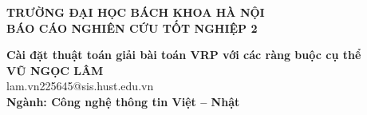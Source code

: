 \documentclass[main.tex]{subfiles}
\begin{document}
  \begin{titlepage}
    \thispagestyle{empty}
    \begin{center}
      {\textbf{\large{TRƯỜNG ĐẠI HỌC BÁCH KHOA HÀ NỘI}}}\\[4cm]

      {\textbf{\huge{BÁO CÁO NGHIÊN CỨU TỐT NGHIỆP 2}}}\\[1cm]
      {\textbf{\Large{\textbf{Cài đặt thuật toán giải bài toán VRP với các ràng buộc cụ thể } }}\\[1cm]

      {\textbf{\large{VŨ NGỌC LÂM}}}\\ {\large{lam.vn225645@sis.hust.edu.vn}}\\[0.5cm]

      {\textbf{\large{Ngành: Công nghệ thông tin Việt -- Nhật }}}%



      \vspace{2cm}


      \begin{table}[H]\centering {}\end{table}}
    \end{center}
  \end{titlepage}
\end{document}
